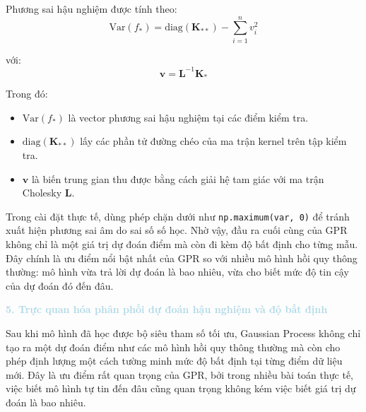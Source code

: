 Phương sai hậu nghiệm được tính theo:
\begin{equation}
    \mathrm{Var}(f_*) = \mathrm{diag}(\mathbf{K}_{**}) - \sum_{i=1}^{n} v_i^2
\end{equation}

với:
\begin{equation}
    \mathbf{v} = \mathbf{L}^{-1}\mathbf{K}_{*}
\end{equation}

Trong đó:
\begin{itemize}
    \item $\mathrm{Var}(f_*)$ là vector phương sai hậu nghiệm tại các điểm kiểm tra.
    \item $\mathrm{diag}(\mathbf{K}_{**})$ lấy các phần tử đường chéo của ma trận kernel trên tập kiểm tra.
    \item $\mathbf{v}$ là biến trung gian thu được bằng cách giải hệ tam giác với ma trận Cholesky $\mathbf{L}$.
\end{itemize}

Trong cài đặt thực tế, dùng phép chặn dưới như \texttt{np.maximum(var, 0)} để tránh xuất hiện phương sai âm do sai số số học. Nhờ vậy, đầu ra cuối cùng của GPR không chỉ là một giá trị dự đoán điểm mà còn đi kèm độ bất định cho từng mẫu. Đây chính là ưu điểm nổi bật nhất của GPR so với nhiều mô hình hồi quy thông thường: mô hình vừa trả lời dự đoán là bao nhiêu, vừa cho biết mức độ tin cậy của dự đoán đó đến đâu.

\noindent\textcolor{lightblue}{\textbf{5. Trực quan hóa phân phối dự đoán hậu nghiệm và độ bất định}}

Sau khi mô hình đã học được bộ siêu tham số tối ưu, Gaussian Process không chỉ tạo ra một dự đoán điểm như các mô hình hồi quy thông thường mà còn cho phép định lượng một cách tường minh mức độ bất định tại từng điểm dữ liệu mới. Đây là ưu điểm rất quan trọng của GPR, bởi trong nhiều bài toán thực tế, việc biết mô hình tự tin đến đâu cũng quan trọng không kém việc biết giá trị dự đoán là bao nhiêu.

